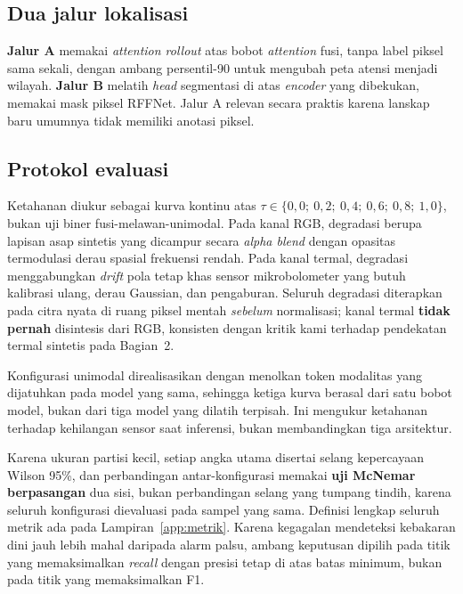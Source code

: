 \subsection{Dua jalur lokalisasi}

\textbf{Jalur A} memakai \emph{attention rollout} atas bobot \emph{attention}
fusi, tanpa label piksel sama sekali, dengan ambang persentil-90 untuk mengubah
peta atensi menjadi wilayah. \textbf{Jalur B} melatih \emph{head} segmentasi di
atas \emph{encoder} yang dibekukan, memakai mask piksel RFFNet. Jalur A relevan
secara praktis karena lanskap baru umumnya tidak memiliki anotasi piksel.

\subsection{Protokol evaluasi}

Ketahanan diukur sebagai kurva kontinu atas $\tau \in \{0{,}0;\ 0{,}2;\ 0{,}4;\
0{,}6;\ 0{,}8;\ 1{,}0\}$, bukan uji biner fusi-melawan-unimodal. Pada kanal RGB,
degradasi berupa lapisan asap sintetis yang dicampur secara \emph{alpha blend}
dengan opasitas termodulasi derau spasial frekuensi rendah. Pada kanal termal,
degradasi menggabungkan \emph{drift} pola tetap khas sensor mikrobolometer yang
butuh kalibrasi ulang, derau Gaussian, dan pengaburan. Seluruh degradasi
diterapkan pada citra nyata di ruang piksel mentah \emph{sebelum} normalisasi;
kanal termal \textbf{tidak pernah} disintesis dari RGB, konsisten dengan kritik
kami terhadap pendekatan termal sintetis pada Bagian~2.

Konfigurasi unimodal direalisasikan dengan menolkan token modalitas yang
dijatuhkan pada model yang sama, sehingga ketiga kurva berasal dari satu bobot
model, bukan dari tiga model yang dilatih terpisah. Ini mengukur ketahanan
terhadap kehilangan sensor saat inferensi, bukan membandingkan tiga arsitektur.

Karena ukuran partisi kecil, setiap angka utama disertai selang kepercayaan
Wilson 95\%, dan perbandingan antar-konfigurasi memakai \textbf{uji McNemar
berpasangan} dua sisi, bukan perbandingan selang yang tumpang tindih, karena
seluruh konfigurasi dievaluasi pada sampel yang sama. Definisi lengkap seluruh
metrik ada pada Lampiran~\ref{app:metrik}. Karena kegagalan mendeteksi kebakaran
dini jauh lebih mahal daripada alarm palsu, ambang keputusan dipilih pada titik
yang memaksimalkan \emph{recall} dengan presisi tetap di atas batas minimum,
bukan pada titik yang memaksimalkan F1.


